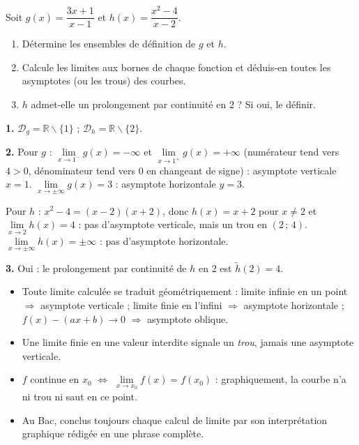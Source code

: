 \documentclass[11pt]{article}
\def\setminus{\mathbin{\backslash}}\let\smallsetminus\setminus
\begin{document}
\begin{exercice}
Soit $g(x) = \dfrac{3x+1}{x-1}$ et $h(x) = \dfrac{x^2-4}{x-2}$.
\begin{enumerate}
\item Détermine les ensembles de définition de $g$ et $h$.
\item Calcule les limites aux bornes de chaque fonction et déduis-en toutes les asymptotes (ou les trous) des courbes.
\item $h$ admet-elle un prolongement par continuité en $2$ ? Si oui, le définir.
\end{enumerate}
\end{exercice}

\begin{corrige}
\textbf{1.} $\mathcal{D}_g = \mathbb{R}\setminus\{1\}$ ; $\mathcal{D}_h = \mathbb{R}\setminus\{2\}$.

\textbf{2.} Pour $g$ : $\lim\limits_{x\to 1^-} g(x) = -\infty$ et $\lim\limits_{x\to 1^+} g(x) = +\infty$ (numérateur tend vers $4>0$, dénominateur tend vers $0$ en changeant de signe) : asymptote verticale $x=1$. $\lim\limits_{x\to \pm\infty} g(x) = 3$ : asymptote horizontale $y=3$.

Pour $h$ : $x^2-4 = (x-2)(x+2)$, donc $h(x) = x+2$ pour $x\neq 2$ et $\lim\limits_{x\to 2} h(x) = 4$ : pas d'asymptote verticale, mais un trou en $(2\,;\,4)$. $\lim\limits_{x\to\pm\infty} h(x) = \pm\infty$ : pas d'asymptote horizontale.

\textbf{3.} Oui : le prolongement par continuité de $h$ en $2$ est $\tilde{h}(2) = 4$.
\end{corrige}

\begin{aretenir}
\begin{itemize}
\item Toute limite calculée se traduit géométriquement : limite infinie en un point $\Rightarrow$ asymptote verticale ; limite finie en l'infini $\Rightarrow$ asymptote horizontale ; $f(x)-(ax+b)\to 0$ $\Rightarrow$ asymptote oblique.
\item Une limite finie en une valeur interdite signale un \emph{trou}, jamais une asymptote verticale.
\item $f$ continue en $x_0$ $\iff$ $\lim\limits_{x\to x_0} f(x) = f(x_0)$ : graphiquement, la courbe n'a ni trou ni saut en ce point.
\item Au Bac, conclus toujours chaque calcul de limite par son interprétation graphique rédigée en une phrase complète.
\end{itemize}
\end{aretenir}
\end{document}
